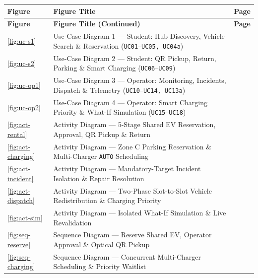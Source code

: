 \documentclass[oneside,final]{hcmut-report}
\begin{document}
{\singlespacing\footnotesize
\renewcommand{\arraystretch}{1.22}
\begin{longtable}[l]{|C{1.5cm}|L{11.85cm}|C{1.32cm}|}
  \hline
  \textbf{Figure} & \textbf{Figure Title} & \textbf{Page} \\
  \hline
  \endfirsthead
  \hline
  \textbf{Figure} & \textbf{Figure Title (Continued)} & \textbf{Page} \\
  \hline
  \endhead
  \endfoot
  \endlastfoot
  \ref{fig:uc-s1} & Use-Case Diagram 1 --- Student: Hub Discovery, Vehicle Search \& Reservation (\texttt{UC01}--\texttt{UC05, UC04a}) & \pageref{fig:uc-s1} \\
  \hline
  \ref{fig:uc-s2} & Use-Case Diagram 2 --- Student: QR Pickup, Return, Parking \& Smart Charging (\texttt{UC06}--\texttt{UC09}) & \pageref{fig:uc-s2} \\
  \hline
  \ref{fig:uc-op1} & Use-Case Diagram 3 --- Operator: Monitoring, Incidents, Dispatch \& Telemetry (\texttt{UC10}--\texttt{UC14, UC13a}) & \pageref{fig:uc-op1} \\
  \hline
  \ref{fig:uc-op2} & Use-Case Diagram 4 --- Operator: Smart Charging Priority \& What-If Simulation (\texttt{UC15}--\texttt{UC18}) & \pageref{fig:uc-op2} \\
  \hline
  \ref{fig:act-rental} & Activity Diagram --- 5-Stage Shared EV Reservation, Approval, QR Pickup \& Return & \pageref{fig:act-rental} \\
  \hline
  \ref{fig:act-charging} & Activity Diagram --- Zone C Parking Reservation \& Multi-Charger \texttt{AUTO} Scheduling & \pageref{fig:act-charging} \\
  \hline
  \ref{fig:act-incident} & Activity Diagram --- Mandatory-Target Incident Isolation \& Repair Resolution & \pageref{fig:act-incident} \\
  \hline
  \ref{fig:act-dispatch} & Activity Diagram --- Two-Phase Slot-to-Slot Vehicle Redistribution \& Charging Priority & \pageref{fig:act-dispatch} \\
  \hline
  \ref{fig:act-sim} & Activity Diagram --- Isolated What-If Simulation \& Live Revalidation & \pageref{fig:act-sim} \\
  \hline
  \ref{fig:seq-reserve} & Sequence Diagram --- Reserve Shared EV, Operator Approval \& Optical QR Pickup & \pageref{fig:seq-reserve} \\
  \hline
  \ref{fig:seq-charging} & Sequence Diagram --- Concurrent Multi-Charger Scheduling \& Priority Waitlist & \pageref{fig:seq-charging} \\

\end{longtable}}
\end{document}
